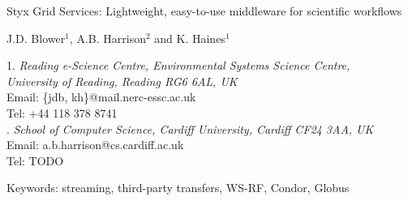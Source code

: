 \documentclass[a4paper]{article}
\begin{document}
\doublespacing

\begin{center}
{\Large Styx Grid Services: Lightweight, easy-to-use middleware for scientific workflows}

\bigskip
\bigskip

{\large J.D. Blower$^{1}$, A.B. Harrison$^{2}$ and K. Haines$^{1}$}

\bigskip

{\small 1. \textit{Reading e-Science Centre, Environmental Systems Science Centre, \\
University of Reading, Reading RG6 6AL, UK} \\
Email: \{jdb, kh\}@mail.nerc-essc.ac.uk\\
Tel: +44 118 378 8741 \\
. \textit{School of Computer Science, Cardiff University, Cardiff CF24 3AA, UK}\\
Email: a.b.harrison@cs.cardiff.ac.uk\\
Tel: TODO}

\bigskip
\bigskip

Keywords: streaming, third-party transfers, WS-RF, Condor, Globus

\end{center}

\newpage

\begin{abstract}
The service-oriented approach to performing distributed scientific research is potentially very powerful but is not yet widely used in many scientific fields.  This is partly due to the technical difficulties involved in creating services and composing them into workflows.  We present the Styx Grid Service, a simple system that wraps command-line programs and allows them to be run over the Internet exactly as if they were local programs.  Styx Grid Services are very easy to create and use and can be composed into powerful workflows with simple shell scripts or more sophisticated graphical tools.  Data can be streamed directly from service to service and progress can be monitored asynchronously using a mechanism that places very few demands on firewalls.  Styx Grid Services can be used as an easy-to-use, uniform interface to Condor and Globus resources, permitting the creation of workflows that span various Grid resources.  We shall show how Styx Grid Services can interoperate with Web Services and WS-Resources.
\end{abstract}
\end{document}

